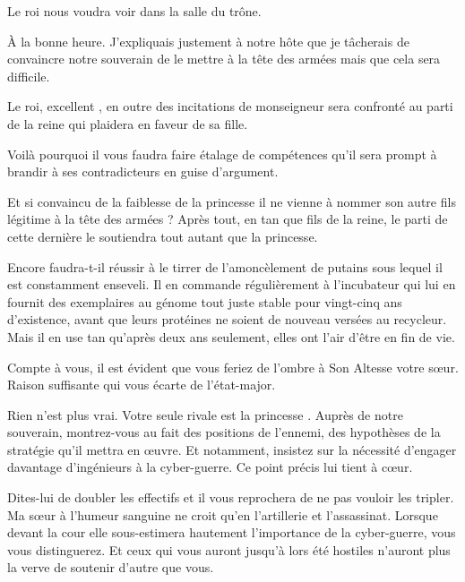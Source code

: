 \scene

\StageDirII{\elena, \general, \alexas}


\begin{drama}
  \alexasspeaks Le roi nous voudra voir dans la salle du trône.

  \elenaspeaks À la bonne heure. J’expliquais justement à notre hôte que je tâcherais de convaincre notre souverain de le mettre à la tête des armées mais que cela sera difficile.

  \alexasspeaks Le roi, excellent \general, en outre des incitations de monseigneur \elena{} sera confronté au parti de la reine qui plaidera en faveur de sa fille. 

  \elenaspeaks Voilà pourquoi il vous faudra faire étalage de compétences qu’il sera prompt à brandir à ses contradicteurs en guise d’argument.

  \generalspeaks Et si convaincu de la faiblesse de la princesse il ne vienne à nommer son autre fils légitime à la tête des armées ? Après tout, en tan que fils de la reine, le parti de cette dernière le soutiendra tout autant que la princesse.

  \elenaspeaks Encore faudra-t-il réussir à le tirrer de l’amoncèlement de putains sous lequel il est constamment enseveli.
  Il en commande régulièrement à l’incubateur qui lui en fournit des exemplaires au génome tout juste stable pour vingt-cinq
  ans d’existence, avant que leurs protéines ne soient de nouveau versées au recycleur. Mais il en use tan qu’après deux ans seulement, elles ont l’air d’être en fin de vie.


  \generalspeaks {} Compte à vous, il est évident que vous feriez de l’ombre à Son Altesse votre sœur. Raison suffisante qui vous écarte de l’état-major.

  \elenaspeaks Rien n’est plus vrai. Votre seule rivale est la princesse \princesse. Auprès de notre souverain, montrez-vous au fait des positions de l’ennemi, des hypothèses de la stratégie qu’il mettra en œuvre. Et notamment, insistez sur la nécessité d’engager davantage d’ingénieurs à la cyber-guerre. Ce point précis lui tient à cœur. 

  Dites-lui de doubler les effectifs et il vous reprochera de ne pas vouloir les tripler. Ma sœur à l’humeur sanguine ne croit qu’en l’artillerie et l’assassinat. Lorsque devant la cour elle sous-estimera hautement l’importance de la cyber-guerre, vous vous distinguerez. Et ceux qui vous auront jusqu’à lors été hostiles n’auront plus la verve de soutenir d’autre que vous.


\end{drama}
